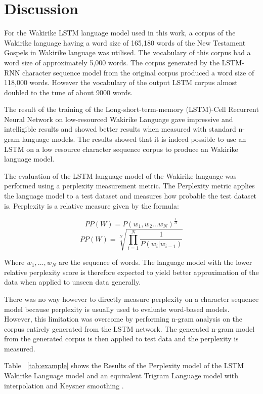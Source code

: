 \documentclass[a4paper]{article}
\begin{document}
\section{Discussion}
For the Wakirike LSTM language model used in this work, a corpus of the Wakirike language having a word size of 165,180 words of the New Testament Gospels in Wakirike language was utilised. The vocabulary of this corpus had a word size of approximately 5,000 words. The corpus generated by the LSTM-RNN character sequence model from the original corpus produced a word size of 118,000 words. However the vocabulary of the output LSTM corpus almost doubled to the tune of about 9000 words. 

The result of the training of the Long-short-term-memory (LSTM)-Cell Recurrent Neural Network on low-resourced Wakirike Language gave impressive and intelligible results and showed better results when measured with standard n-gram language models. The results showed that it is indeed possible to use an LSTM on a low resource character sequence corpus to produce an Wakirike language model.

The evaluation of the LSTM language model of the Wakirike language was performed using a perplexity measurement metric. The Perplexity metric applies the language model to a test dataset and measures how probable the test dataset is. Perplexity is a relative measure given by the formula:

%
\begin{equation}
PP(W)=P(w_1,w_2\dots w_N)^\frac{1}{N}
\label{eq6}
\end{equation}
%
%
\begin{equation}
PP(W)=\sqrt[N]{\prod_{i=1}^N\frac{1}{P(w_i|w_{i-1})}}
\label{eq7}
\end{equation}
%

Where $w_1,\dots,w_N$ are the sequence of words. The language model with the lower relative perplexity score is therefore expected to yield better approximation of the data when applied to unseen data generally.

There was no way however to directly measure perplexity on a character sequence model because perplexity is usually used to evaluate word-based models.  However, this limitation was overcome by performing n-gram analysis on the corpus entirely generated from the LSTM network. The generated n-gram model from the generated corpus is then applied to test data and the perplexity is measured.

Table ~\ref{tab:example}  shows the Results of the Perplexity model of the LSTM Wakirike Language model and an equivalent Trigram Language model with interpolation and Keysner smoothing \cite{chen1996empirical}.
\end{document}
